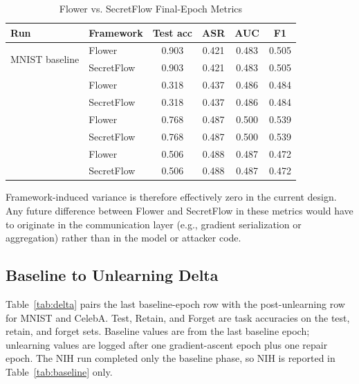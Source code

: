 \documentclass[sigconf,anonymous]{acmart}
\begin{document}
\begin{table}[t]
\centering
\small
\caption{Flower vs. SecretFlow Final-Epoch Metrics}
\label{tab:parity}
\begin{tabular}{@{}llcccc@{}}
\toprule
Run & Framework & Test acc & ASR & AUC & F1 \\
\midrule
\multirow{2}{*}{MNIST baseline}
    & Flower     & 0.903 & 0.421 & 0.483 & 0.505 \\
    & SecretFlow & 0.903 & 0.421 & 0.483 & 0.505 \\
\addlinespace[2pt]
\multirow{2}{*}{MNIST unlearn}
    & Flower     & 0.318 & 0.437 & 0.486 & 0.484 \\
    & SecretFlow & 0.318 & 0.437 & 0.486 & 0.484 \\
\addlinespace[2pt]
\multirow{2}{*}{CelebA baseline}
    & Flower     & 0.768 & 0.487 & 0.500 & 0.539 \\
    & SecretFlow & 0.768 & 0.487 & 0.500 & 0.539 \\
\addlinespace[2pt]
\multirow{2}{*}{CelebA unlearn}
    & Flower     & 0.506 & 0.488 & 0.487 & 0.472 \\
    & SecretFlow & 0.506 & 0.488 & 0.487 & 0.472 \\
\bottomrule
\end{tabular}
\end{table}

Framework-induced variance is therefore effectively zero in the current design. Any future difference between Flower and SecretFlow in these metrics would have to originate in the communication layer (e.g., gradient serialization or aggregation) rather than in the model or attacker code.

\subsection{Baseline to Unlearning Delta}

Table~\ref{tab:delta} pairs the last baseline-epoch row with the post-unlearning row for MNIST and CelebA. Test, Retain, and Forget are task accuracies on the test, retain, and forget sets. Baseline values are from the last baseline epoch; unlearning values are logged after one gradient-ascent epoch plus one repair epoch. The NIH run completed only the baseline phase, so NIH is reported in Table~\ref{tab:baseline} only.
\end{document}
